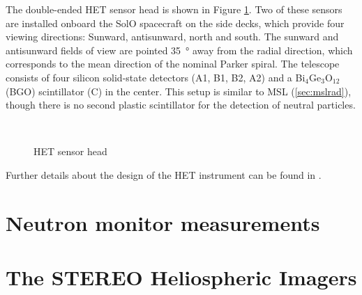 The double-ended \ac{HET} sensor head is shown in Figure \ref{fig:het-sensorhead}. Two of these sensors are installed onboard the \ac{SolO} spacecraft on the side decks, which provide four viewing directions: Sunward, antisunward, north and south. The sunward and antisunward fields of view are pointed \SI{35}{\degree} away from the radial direction, which corresponds to the mean direction of the nominal Parker spiral. The telescope consists of four silicon solid-state detectors (A1, B1, B2, A2) and a Bi$_4$Ge$_3$O$_{12}$ (BGO) scintillator (C) in the center. This setup is similar to \ac{MSL} (\autoref{sec:mslrad}), though there is no second plastic scintillator for the detection of neutral particles.



\begin{figure}
    \centering
    \\
    \caption[\acs{HET} sensor head]{\acs{HET} sensor head}
    \label{fig:het-sensorhead}
\end{figure}

Further details about the design of the \ac{HET} instrument can be found in \cite{Elftmann-2020-PhD}. 

\section{Neutron monitor measurements}
\label{sec:neutronmonitors}

\section{The STEREO Heliospheric Imagers}
\label{sec:stereohi}

